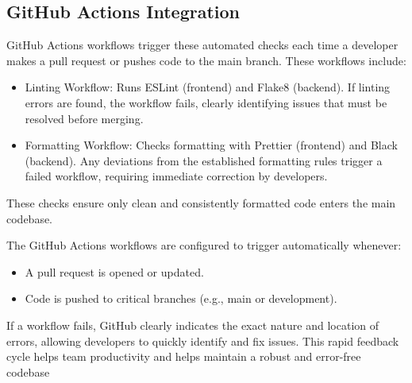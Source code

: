 \documentclass[12pt, titlepage]{article}
\begin{document}
\subsection{GitHub Actions Integration}
GitHub Actions workflows trigger these automated checks each time a developer makes a pull request or pushes code to the main branch. These workflows include:
\begin{itemize}
\item Linting Workflow: Runs ESLint (frontend) and Flake8 (backend). If linting errors are found, the workflow fails, clearly identifying issues that must be resolved before merging.
\item Formatting Workflow: Checks formatting with Prettier (frontend) and Black (backend). Any deviations from the established formatting rules trigger a failed workflow, requiring immediate correction by developers.
\end{itemize}

These checks ensure only clean and consistently formatted code enters the main codebase.

The GitHub Actions workflows are configured to trigger automatically whenever:
\begin{itemize}
\item A pull request is opened or updated.
\item Code is pushed to critical branches (e.g., main or development).
\end{itemize}

If a workflow fails, GitHub clearly indicates the exact nature and location of errors, allowing developers to quickly identify and fix issues. This rapid feedback cycle helps team productivity and helps maintain a robust and error-free codebase
\end{document}
